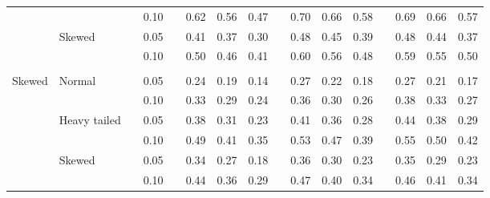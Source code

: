 \documentclass{article} %
\begin{document}
\begin{table}[ht]
\begin{scriptsize}
\begin{center}
\begin{tabular}{ll p{.1cm} c p{.1cm} rrr p{.1cm} rrr p{.1cm} rrr}
             &              && 0.10 &&   0.62 & 0.56 & 0.47 && 0.70 & 0.66 & 0.58 && 0.69 & 0.66 & 0.57 \\
             & Skewed       && 0.05 &&   0.41 & 0.37 & 0.30 && 0.48 & 0.45 & 0.39 && 0.48 & 0.44 & 0.37 \\
             &              && 0.10 &&   0.50 & 0.46 & 0.41 && 0.60 & 0.56 & 0.48 && 0.59 & 0.55 & 0.50 \\
             &&&&&&&&&&&&&&&\\
Skewed       & Normal       && 0.05 &&   0.24 & 0.19 & 0.14 && 0.27 & 0.22 & 0.18 &&  0.27 & 0.21 & 0.17 \\ 
             &              && 0.10 &&   0.33 & 0.29 & 0.24 && 0.36 & 0.30 & 0.26 &&  0.38 & 0.33 & 0.27 \\ 
             & Heavy tailed && 0.05 &&   0.38 & 0.31 & 0.23 && 0.41 & 0.36 & 0.28 &&  0.44 & 0.38 & 0.29 \\ 
             &              && 0.10 &&   0.49 & 0.41 & 0.35 && 0.53 & 0.47 & 0.39 &&  0.55 & 0.50 & 0.42 \\ 
             & Skewed       && 0.05 &&   0.34 & 0.27 & 0.18 && 0.36 & 0.30 & 0.23 &&  0.35 & 0.29 & 0.23 \\ 
             &              && 0.10 &&   0.44 & 0.36 & 0.29 && 0.47 & 0.40 & 0.34 &&  0.46 & 0.41 & 0.34 \\ 



\end{tabular}
\end{center}
\end{scriptsize}
\end{table}
\end{document}
